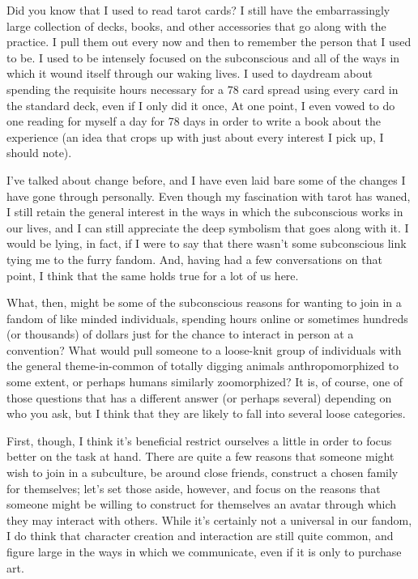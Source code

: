 
Did you know that I used to read tarot cards? I still have the embarrassingly large collection of decks, books, and other accessories that go along with the practice.  I pull them out every now and then to remember the person that I used to be.  I used to be intensely focused on the subconscious and all of the ways in which it wound itself through our waking lives. I used to daydream about spending the requisite hours necessary for a 78 card spread using every card in the standard deck, even if I only did it once,  At one point, I even vowed to do one reading for myself a day for 78 days in order to write a book about the experience (an idea that crops up with just about every interest I pick up, I should note).

I've talked about change before, and I have even laid bare some of the changes I have gone through personally.  Even though my fascination with tarot has waned, I still retain the general interest in the ways in which the subconscious works in our lives, and I can still appreciate the deep symbolism that goes along with it. I would be lying, in fact, if I were to say that there wasn't some subconscious link tying me to the furry fandom. And, having had a few conversations on that point, I think that the same holds true for a lot of us here.

What, then, might be some of the subconscious reasons for wanting to join in a fandom of like minded individuals, spending hours online or sometimes hundreds (or thousands) of dollars just for the chance to interact in person at a convention? What would pull someone to a loose-knit group of individuals with the general theme-in-common of totally digging animals anthropomorphized to some extent, or perhaps humans similarly zoomorphized?  It is, of course, one of those questions that has a different answer (or perhaps several) depending on who you ask, but I think that they are likely to fall into several loose categories.

First, though, I think it's beneficial restrict ourselves a little in order to focus better on the task at hand.  There are quite a few reasons that someone might wish to join in a subculture, be around close friends, construct a chosen family for themselves; let's set those aside, however, and focus on the reasons that someone might be willing to construct for themselves an avatar through which they may interact with others.  While it's certainly not a universal in our fandom, I do think that character creation and interaction are still quite common, and figure large in the ways in which we communicate, even if it is only to purchase art.

